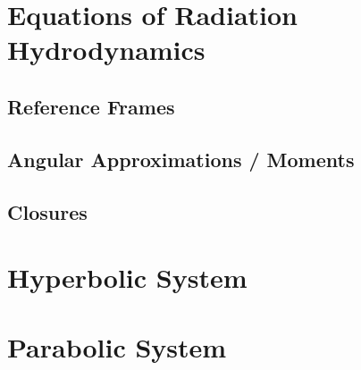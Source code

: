 \label{ch:radiation}

\section{Equations of Radiation Hydrodynamics}

\subsection{Reference Frames}

\subsection{Angular Approximations / Moments}

\subsection{Closures}



\section{Hyperbolic System}



\section{Parabolic System}

